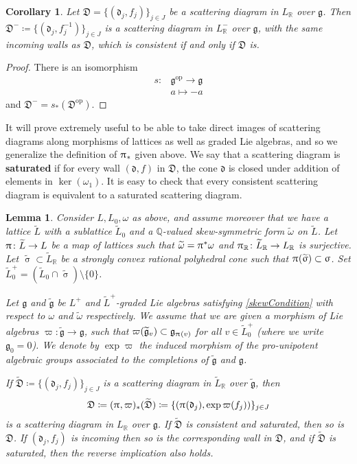 \documentclass{amsart}
\DeclareMathOperator{\opp}{op}
\let\bb=\mathbb
\let\rar=\rightarrow
\let\f=\mathfrak
\let\wt=\widetilde
\renewcommand{\pi}{\uppi\hspace{0.05em}}
\renewcommand{\sigma}{\upsigma}
\theoremstyle{plain}%
\newtheorem{lem}[thm]{Lemma}
\newtheorem{cor}[thm]{Corollary}
\theoremstyle{definition}
\theoremstyle{remark}
\begin{document}
\begin{cor}
\label{reverse_cor}
Let $\f{D}=\{(\f{d}_j,f_j)\}_{j\in J}$ be a scattering diagram in $L_{\mathbb{R}}$ over $\f{g}$.  Then $\f{D}^-\coloneqq \{(\f{d}_j,f_j^{-1})\}_{j\in J}$ is a scattering diagram in $L^-_{\bb{R}}$ over $\mathfrak{g}$, with the same incoming walls as $\f{D}$, which is consistent if and only if $\f{D}$ is.
\end{cor}
\begin{proof}
There is an isomorphism
\begin{align*}
    s\colon &\f{g}^{\opp}\rightarrow \f{g}\\
    &a\mapsto -a
\end{align*}
and $\f{D}^-=s_*(\f{D}^{\opp})$.
\end{proof}
It will prove extremely useful to be able to take direct images of scattering diagrams along morphisms of lattices as well as graded Lie algebras, and so we generalize the definition of $\pi_*$ given above.  We say that a scattering diagram is \textbf{saturated} if for every wall $(\f{d},f)$ in $\f{D}$, the cone $\f{d}$ is closed under addition of elements in $\ker(\omega_1)$.  It is easy to check that every consistent scattering diagram is equivalent to a saturated scattering diagram.
\begin{lem}\label{QuotientScat}
Consider $L,L_0,\omega$ as above, and assume moreover that we have a lattice $\wt{L}$ with a sublattice $\wt{L}_0$ and a $\bb{Q}$-valued skew-symmetric form $\wt{\omega}$ on $\wt{L}$. Let $\pi\colon \wt{L}\rar L$ be a map of lattices such that $\wt{\omega}=\pi^* \omega$ and $\pi_{\bb{R}}\colon \wt{L}_{\bb{R}}\rightarrow L_{\bb{R}}$ is surjective.  Let $\wt{\sigma}\subset \wt{L}_{\bb{R}}$ be a strongly convex rational polyhedral cone such that $\pi(\wt{\sigma})\subset \sigma$.  Set $\wt{L}_0^+=(\wt{L}_0\cap \wt{\sigma})\setminus \{0\}$.

Let $\f{g}$ and $\wt{\f{g}}$ be $L^+$ and $\tilde{L}^+$-graded Lie algebras satisfying \eqref{skewCondition} with respect to $\omega$ and $\wt{\omega}$ respectively.  We assume that we are given a morphism of Lie algebras $\varpi\colon \wt{\f{g}}\rightarrow \f{g}$, such that $\varpi(\wt{\f{g}}_v)\subset \f{g}_{\pi(v)}$ for all $v\in \wt{L}_0^+$ (where we write $\f{g}_0=0$).  We denote by $\exp\varpi$ the induced morphism of the pro-unipotent algebraic groups associated to the completions of $\wt{\f{g}}$ and $\f{g}$. 

If 
$\wt{\f{D}}\coloneqq \{(\f{d}_j,f_{j})\}_{j\in J}$ is a scattering diagram in $\wt{L}_{\bb{R}}$ over $\wt{\f{g}}$, then 
\begin{align}\label{piD}
    \f{D}\coloneqq (\pi,\varpi)_*(\wt{\f{D}})\coloneqq \{(\pi(\f{d}_j),\exp\varpi(f_{j}))\}_{j\in J}
\end{align}
is a scattering diagram in $L_{\bb{R}}$ over $\f{g}$.  If $\wt{\f{D}}$ is consistent and saturated, then so is $\f{D}$. 
If $(\f{d}_j, f_j)$ is incoming then so is the corresponding wall in $\f{D}$, and if $\wt{\f{D}}$ is saturated, then the reverse implication also holds.
\end{lem}
\end{document}
